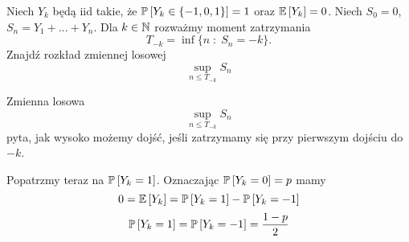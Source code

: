 \begin{problem}
  Niech $Y_k$ będą iid takie, że $\prob{Y_k\in\{-1,0,1\}}=1$ oraz $\expected{Y_k}=0$. Niech $S_0=0$, $S_n=Y_1+...+Y_n$. Dla $k\in\operatorname{\mathbb{N}}$ rozważmy moment zatrzymania
  $$T_{-k}=\inf\{n\;:\;S_n=-k\}.$$
  Znajdź rozkład zmiennej losowej
  $$\sup_{n\leq T_{-k}}S_n$$
\end{problem}

\begin{solution}
  Zmienna losowa
  $$\sup_{n\leq T_{-k}}S_n$$
  pyta, jak wysoko możemy dojść, jeśli zatrzymamy się przy pierwszym dojściu do $-k$.

  Popatrzmy teraz na $\prob{Y_k=1}$. Oznaczając $\prob{Y_k=0}=p$ mamy
  $$0=\expected{Y_k}=\prob{Y_k=1}-\prob{Y_k=-1}$$
  $$\prob{Y_k=1}=\prob{Y_k=-1}=\frac{1-p}{2}$$
\end{solution}
